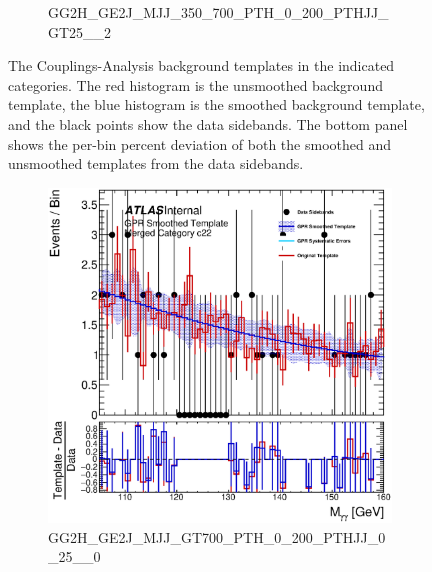 \begin{figure}
\begin{center}
\begin{subfigure}[T]{0.49\linewidth}
	\caption{\tiny{GG2H\_GE2J\_MJJ\_350\_700\_PTH\_0\_200\_PTHJJ\_GT25\_\_2}}
\end{subfigure}
\caption{The Couplings-Analysis background templates in the indicated categories. The red histogram is the unsmoothed background template, the blue histogram is the smoothed background template, and the black points show the data sidebands. The bottom panel shows the per-bin percent deviation of both the smoothed and unsmoothed templates from the data sidebands. }
 \label{fig:gpr_coupcat_5}
 \end{center}
\end{figure}

\begin{figure} 
\begin{center}
\begin{subfigure}[T]{0.49\linewidth}
	\centering
	\includegraphics[width=\linewidth]{figures/background/gpr/coupCatTemplates/GPR_Smoothed_Plot_hmgg_c22.eps}
	\caption{\tiny{GG2H\_GE2J\_MJJ\_GT700\_PTH\_0\_200\_PTHJJ\_0\_25\_\_0}}
\end{subfigure}
\begin{subfigure}[T]{0.49\linewidth}
	\centering

\end{subfigure}
\end{center}
\end{figure}
